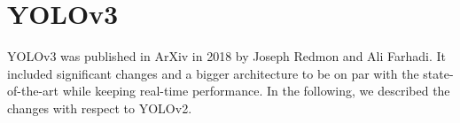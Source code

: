 \documentclass{article}
\begin{document}

\section{YOLOv3}



YOLOv3 \cite{redmon2018yolov3} was published in ArXiv in 2018 by Joseph Redmon and Ali Farhadi. It included significant changes and a bigger architecture to be on par with the state-of-the-art while keeping real-time performance. In the following, we described the changes with respect to YOLOv2.
\end{document}

